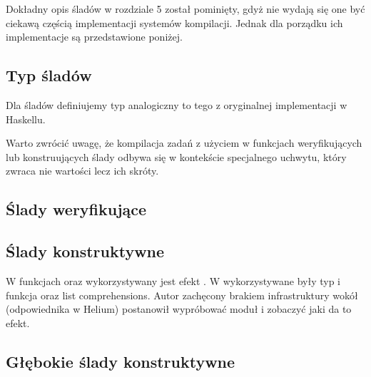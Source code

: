 Dokładny opis śladów w rozdziale 5 został pominięty, gdyż nie wydają się one być ciekawą częścią implementacji systemów kompilacji. Jednak dla porządku ich implementacje są przedstawione poniżej.

\subsection{Typ śladów}

Dla śladów definiujemy typ analogiczny to tego z oryginalnej implementacji w Haskellu.

\begin{minipage}{\textwidth}
  
\end{minipage}

Warto zwrócić uwagę, że kompilacja zadań z użyciem  w funkcjach weryfikujących lub konstruujących ślady odbywa się w kontekście specjalnego uchwytu, który zwraca nie wartości lecz ich skróty.

\subsection{Ślady weryfikujące}

\begin{minipage}{\textwidth}
  
\end{minipage}

\subsection{Ślady konstruktywne}

\begin{minipage}{\textwidth}
  
\end{minipage}

W funkcjach  oraz  wykorzystywany jest efekt . W \BSaLC{} wykorzystywane były typ  i funkcja  oraz list comprehensions. Autor zachęcony brakiem infrastruktury wokół  (odpowiednika  w Helium) postanowił wypróbować moduł  i zobaczyć jaki da to efekt.

\subsection{Głębokie ślady konstruktywne}

\begin{minipage}{\textwidth}
  
\end{minipage}
